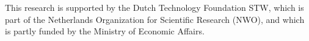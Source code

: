 
This research is supported by the Dutch Technology Foundation STW, which is part
of the Netherlands Organization for Scientific Research (NWO), and which is
partly funded by the Ministry of Economic Affairs.

